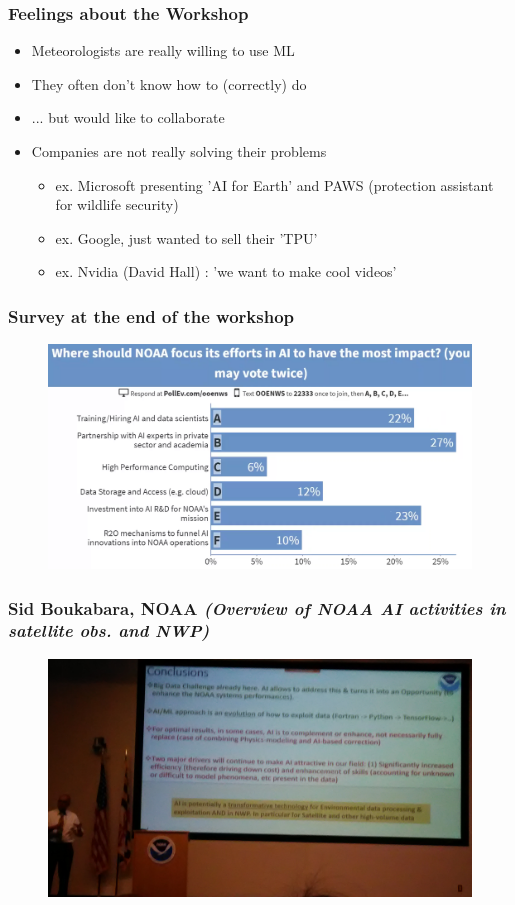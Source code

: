 \documentclass{beamer}
\begin{document}
\begin{frame}
\frametitle{Feelings about the Workshop}

\begin{itemize}
	\item Meteorologists are really willing to use ML
	\item They often don't know how to (correctly) do
	\item ... but would like to collaborate
	\item Companies are not really solving their problems
		\begin{itemize}
			\item ex. Microsoft presenting 'AI for Earth' and PAWS (protection assistant for wildlife security)
			\item ex. Google, just wanted to sell their 'TPU'
			\item ex. Nvidia (David Hall) : 'we want to make cool videos' 
		\end{itemize}
\end{itemize}
\end{frame}

\begin{frame}
\frametitle{Survey at the end of the workshop}
\begin{figure}
	\includegraphics[width=\linewidth]{figs/Screenshot_end_workshop.png}
\end{figure}
\end{frame}


\begin{frame}
\frametitle{Sid Boukabara, NOAA \textit{(Overview of NOAA AI activities in satellite obs. and NWP)}}
\begin{figure}
	\includegraphics[width=\linewidth]{figs/P_20190423_111607.jpg}
\end{figure}
\end{frame}
\end{document}
